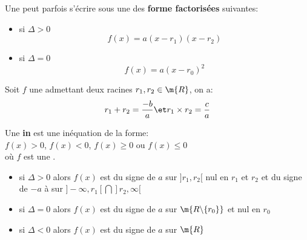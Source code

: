 Une  peut parfois s'écrire sous une des \textbf{forme factorisées} suivantes:
\begin{itemize}
    \item si $\Delta>0$
    \begin{equation*}
        f(x) = a(x-r_1)(x-r_2)
    \end{equation*}
    \item si $\Delta=0$
    \begin{equation*}
        f(x) = a(x-r_0)^2
    \end{equation*}
\end{itemize}

\rmq{}
Soit $f$ une  admettant deux racines $r_1,r_2\in\m{R}$, on a:
\begin{equation*}
    r_1+r_2 = \frac{-b}{a} \et r_1\times r_2 = \frac{c}{a}
\end{equation*}

\newpage
\hbox{}

Une \textbf{in} est une inéquation de la forme:\\
$f(x) > 0$, $f(x) < 0$, $f(x) \geqslant 0$ ou $f(x) \leqslant 0$\\
où $f$ est une .

\begin{itemize}
    \item si $\Delta>0$ alors $f(x)$ est du signe de $a$ sur $]r_1,r_2[$ nul en $r_1$ et $r_2$
    et du signe de $-a$ à sur $]-\infty,r_1[\bigcap]r_2,\infty[$
    \item si $\Delta=0$ alors $f(x)$ est du signe de $a$ sur $\m{R\backslash\{r_0\}}$ et nul en $r_0$
    \item si $\Delta<0$ alors $f(x)$ est du signe de $a$ sur $\m{R}$
\end{itemize}
